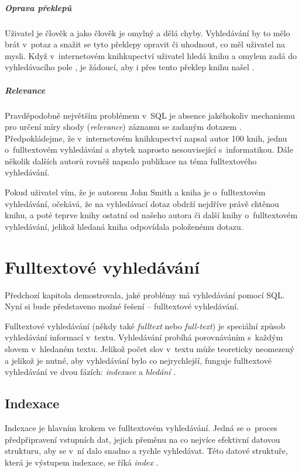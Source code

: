 \documentclass[11pt,oneside]{fithesis2}
\begin{document}
\subparagraph{Oprava překlepů}
Uživatel je člověk a jako člověk je omylný a dělá chyby. Vyhledávání by to mělo brát v~potaz a snažit se tyto překlepy opravit či uhodnout, co měl uživatel na mysli. Když v~internetovém knihkupectví uživatel hledá knihu  a
omylem zadá do vyhledávacího pole , je žádoucí, aby i přes tento překlep knihu našel \cite[s.~10]{HibernateSearchAction}.

\subparagraph{Relevance}
Pravděpodobně největším problémem v~SQL je absence jakéhokoliv mechanismu pro určení míry shody (\emph{relevance}) záznamu se zadaným dotazem \cite[s.~10]{HibernateSearchAction}. Předpokládejme, že v~internetovém knihkupectví napsal autor  100 knih, jednu o~fulltextovém vyhledávání a zbytek naprosto nesouvisející s~informatikou. Dále několik dalších autorů rovněž napsalo publikace na téma fulltextového vyhledávání.

Pokud uživatel vím, že je autorem John Smith a kniha je o~fulltextovém vyhledávání, očekává, že na vyhledávací dotaz  obdrží nejdříve právě chtěnou knihu, a poté teprve knihy ostatní od našeho autora či
další knihy o~fulltextovém vyhledávání, jelikož hledaná kniha  odpovídala položenému dotazu.

\section{Fulltextové vyhledávání}
Předchozí kapitola demostrovala, jaké problémy má vyhledávání pomocí SQL. Nyní si bude představeno možné řešení -- fulltextové vyhledávání. 

\label{UvodDoFulltextu}
Fulltextové vyhledávání (někdy také \emph{fulltext} nebo \emph{full-text}) je speciální způsob vyhledávání informací v~textu. Vyhledávání probíhá porovnáváním s~každým slovem v~hledaném textu. Jelikož počet slov v~textu může teoreticky neomezený a jelikož je 
nutné, aby vyhledávání bylo co nejrychlejší, funguje fulltextové vyhledávání ve dvou fázích: \emph{indexace} a \emph{hledání} \cite[s.~11]{HibernateSearchAction}. 

\subsection{Indexace}
Indexace je hlavním krokem ve fulltextovém vyhledávání. Jedná se o~proces předpřipravení vstupních dat, jejich přeměnu na co nejvíce efektivní datovou strukturu, aby se v~ní dalo snadno a rychle vyhledávat. Této datové struktuře, která je výstupem indexace, se říká \emph{index} \cite[s.~11]{LuceneAction}. 
\end{document}
